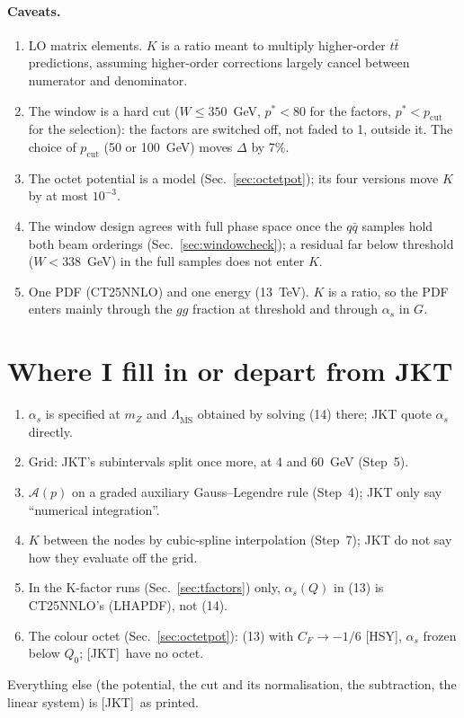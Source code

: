 \documentclass[11pt]{article}
\newcommand{\alphas}{\alpha_s}
\newcommand{\JKT}{[JKT]}
\newcommand{\HSY}{[HSY]}
\newcommand{\As}{\mathcal{A}}
\newcommand{\MS}{\overline{\mathrm{MS}}}
\begin{document}
\paragraph{Caveats.}
\begin{enumerate}
  \item LO matrix elements. $K$ is a ratio meant to multiply higher-order $t\bar t$ predictions, assuming higher-order corrections
        largely cancel between numerator and denominator.
  \item The window is a hard cut ($W\le350$~GeV, $p^*<80$ for the factors, $p^*<p_\mathrm{cut}$ for the selection): the factors are
        switched off, not faded to 1, outside it. The choice of $p_\mathrm{cut}$ (50 or 100~GeV) moves $\Delta$ by 7\%.
  \item The octet potential is a model (Sec.~\ref{sec:octetpot}); its four versions move $K$ by at most $10^{-3}$.
  \item The window design agrees with full phase space once the $q\bar q$ samples hold both beam orderings
        (Sec.~\ref{sec:windowcheck}); a residual far below threshold ($W<338$~GeV) in the full samples does not enter $K$.
  \item One PDF (CT25NNLO) and one energy (13~TeV). $K$ is a ratio, so the PDF enters mainly through the $gg$ fraction at threshold
        and through $\alpha_s$ in $G$.
\end{enumerate}
\section{Where I fill in or depart from JKT}
\label{sec:departures}
\begin{enumerate}
  \item $\alphas$ is specified at $m_Z$ and $\Lambda_{\MS}$ obtained by solving (14) there; JKT quote $\alphas$ directly.
  \item Grid: JKT's subintervals split once more, at 4 and 60~GeV (Step~5).
  \item $\As(p)$ on a graded auxiliary Gauss--Legendre rule (Step~4); JKT only say ``numerical integration''.
  \item $K$ between the nodes by cubic-spline interpolation (Step~7); JKT do not say how they evaluate off the grid.
  \item In the K-factor runs (Sec.~\ref{sec:tfactors}) only, $\alpha_s(Q)$ in (13) is CT25NNLO's (LHAPDF), not (14).
  \item The colour octet (Sec.~\ref{sec:octetpot}): (13) with $C_F\to-1/6$ \HSY, $\alpha_s$ frozen below $Q_0$; \JKT\ have no octet.
\end{enumerate}
Everything else (the potential, the cut and its normalisation, the subtraction, the linear system) is \JKT\ as printed.
\end{document}
